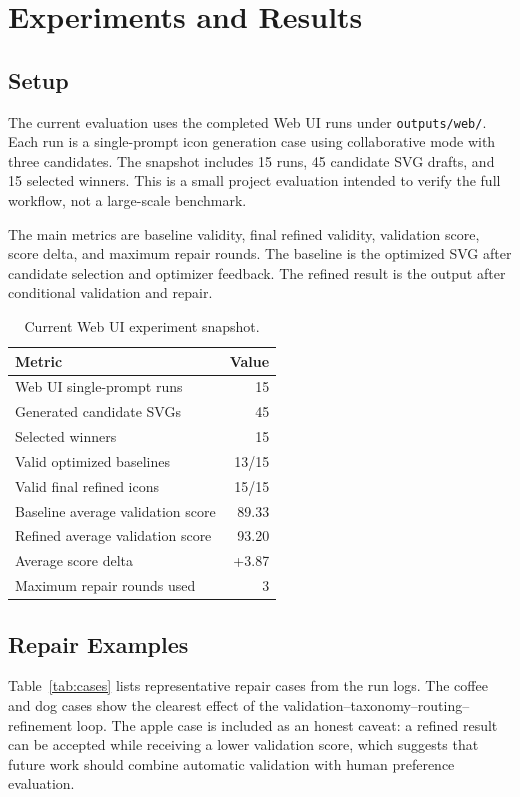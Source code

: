 \documentclass[10pt]{article}
\begin{document}
\section{Experiments and Results}

\subsection{Setup}

The current evaluation uses the completed Web UI runs under \texttt{outputs/web/}.
Each run is a single-prompt icon generation case using collaborative mode with three candidates.
The snapshot includes 15 runs, 45 candidate SVG drafts, and 15 selected winners.
This is a small project evaluation intended to verify the full workflow, not a large-scale benchmark.

The main metrics are baseline validity, final refined validity, validation score, score delta, and maximum repair rounds.
The baseline is the optimized SVG after candidate selection and optimizer feedback.
The refined result is the output after conditional validation and repair.

\begin{table}[t]
\centering
\caption{Current Web UI experiment snapshot.}
\label{tab:metrics}
\begin{tabular}{lr}
\toprule
Metric & Value \\
\midrule
Web UI single-prompt runs & 15 \\
Generated candidate SVGs & 45 \\
Selected winners & 15 \\
Valid optimized baselines & 13/15 \\
Valid final refined icons & 15/15 \\
Baseline average validation score & 89.33 \\
Refined average validation score & 93.20 \\
Average score delta & +3.87 \\
Maximum repair rounds used & 3 \\
\bottomrule
\end{tabular}
\end{table}

\subsection{Repair Examples}

Table~\ref{tab:cases} lists representative repair cases from the run logs.
The coffee and dog cases show the clearest effect of the validation--taxonomy--routing--refinement loop.
The apple case is included as an honest caveat: a refined result can be accepted while receiving a lower validation score, which suggests that future work should combine automatic validation with human preference evaluation.
\end{document}
